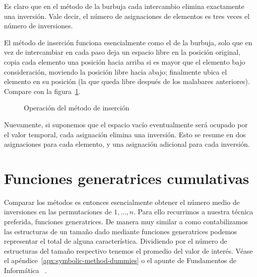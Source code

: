   Es claro que en el método de la burbuja cada intercambio
  elimina exactamente una inversión.
  Vale decir,
  el número de asignaciones de elementos
  es tres veces el número de inversiones.

  El método de inserción funciona esencialmente como el de la burbuja,
  solo que en vez de intercambiar en cada paso
  deja un espacio libre en la posición original,
  copia cada elemento una posición hacia arriba
  si es mayor que el elemento bajo consideración,
  moviendo la posición libre hacia abajo;
  finalmente ubica el elemento en su posición
  (la que queda libre después de los malabares anteriores).
  Compare con la figura~\ref{fig:insercion}.
  \begin{figure}[ht]
    \centering
    \caption{Operación del método de inserción}
    \label{fig:insercion}
  \end{figure}
  Nuevamente,
  si suponemos que el espacio vacío
  eventualmente será ocupado por el valor temporal,
  cada asignación elimina una inversión.
  Esto se resume en dos asignaciones para cada elemento,
  y una asignación adicional para cada inversión.

\section{Funciones generatrices cumulativas}
\label{sec:func-gener-cumul}

  Comparar los métodos
  es entonces esencialmente obtener el número medio de inversiones
  en las permutaciones de \(1, \dotsc, n\).
  Para ello recurrimos a nuestra técnica preferida,
  funciones generatrices.
  De manera muy similar
  a como contabilizamos las estructuras de un tamaño dado
  mediante funciones generatrices
  podemos representar el total de alguna característica.
  Dividiendo por el número de estructuras del tamaño respectivo
  tenemos el promedio del valor de interés.
  Véase el apéndice~\ref{apx:symbolic-method-dummies}
  o el apunte de Fundamentos de Informática~%
    \cite{brand17:_fundamentos_informatica}.

